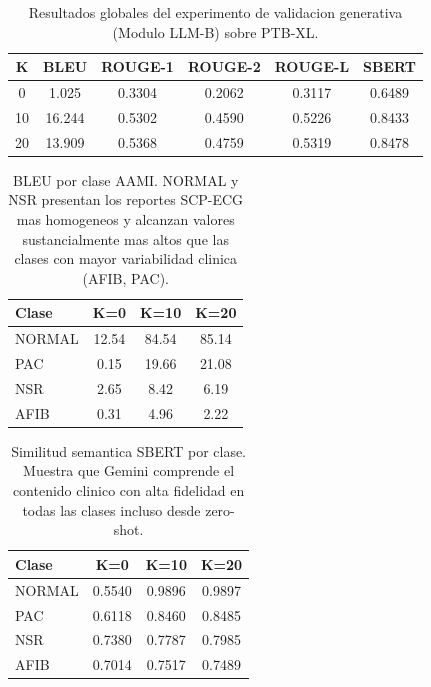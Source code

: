 
\begin{table}[H]
\centering
\caption{Resultados globales del experimento de validacion generativa (Modulo LLM-B) sobre PTB-XL.}
\label{tab:llm-b-global}
\begin{tabular}{cccccc}
\hline
\textbf{K} & \textbf{BLEU} & \textbf{ROUGE-1} & \textbf{ROUGE-2} & \textbf{ROUGE-L} & \textbf{SBERT} \\
\hline
0 & 1.025 & 0.3304 & 0.2062 & 0.3117 & 0.6489 \\
10 & 16.244 & 0.5302 & 0.4590 & 0.5226 & 0.8433 \\
20 & 13.909 & 0.5368 & 0.4759 & 0.5319 & 0.8478 \\
\hline
\end{tabular}
\end{table}

\begin{table}[H]
\centering
\caption{BLEU por clase AAMI. NORMAL y NSR presentan los reportes SCP-ECG mas homogeneos y alcanzan valores sustancialmente mas altos que las clases con mayor variabilidad clinica (AFIB, PAC).}
\label{tab:llm-b-bleu-clase}
\begin{tabular}{lccc}
\hline
\textbf{Clase} & \textbf{K=0} & \textbf{K=10} & \textbf{K=20} \\
\hline
NORMAL & 12.54 & 84.54 & 85.14 \\
PAC & 0.15 & 19.66 & 21.08 \\
NSR & 2.65 & 8.42 & 6.19 \\
AFIB & 0.31 & 4.96 & 2.22 \\
\hline
\end{tabular}
\end{table}

\begin{table}[H]
\centering
\caption{Similitud semantica SBERT por clase. Muestra que Gemini comprende el contenido clinico con alta fidelidad en todas las clases incluso desde zero-shot.}
\label{tab:llm-b-sbert-clase}
\begin{tabular}{lccc}
\hline
\textbf{Clase} & \textbf{K=0} & \textbf{K=10} & \textbf{K=20} \\
\hline
NORMAL & 0.5540 & 0.9896 & 0.9897 \\
PAC & 0.6118 & 0.8460 & 0.8485 \\
NSR & 0.7380 & 0.7787 & 0.7985 \\
AFIB & 0.7014 & 0.7517 & 0.7489 \\
\hline
\end{tabular}
\end{table}